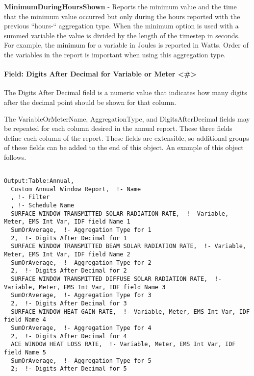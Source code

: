 \textbf{MinimumDuringHoursShown} - Reports the minimum value and the time that the minimum value occurred but only during the hours reported with the previous ``hours-`` aggregation type. When the minimum option is used with a summed variable the value is divided by the length of the timestep in seconds. For example, the minimum for a variable in Joules is reported in Watts. Order of the variables in the report is important when using this aggregation type.

\paragraph{Field: Digits After Decimal for Variable or Meter \textless{}\#\textgreater{}}\label{field-digits-after-decimal-for-variable-or-meter}

The Digits After Decimal field is a numeric value that indicates how many digits after the decimal point should be shown for that column.

The VariableOrMeterName, AggregationType, and DigitsAfterDecimal fields may be repeated for each column desired in the annual report. These three fields define each column of the report.  These fields are extensible, so additional groups of these fields can be added to the end of this object.  An example of this object follows.

\begin{lstlisting}

Output:Table:Annual,
  Custom Annual Window Report,  !- Name
  , !- Filter
  , !- Schedule Name
  SURFACE WINDOW TRANSMITTED SOLAR RADIATION RATE,  !- Variable, Meter, EMS Int Var, IDF field Name 1
  SumOrAverage,  !- Aggregation Type for 1
  2,  !- Digits After Decimal for 1
  SURFACE WINDOW TRANSMITTED BEAM SOLAR RADIATION RATE,  !- Variable, Meter, EMS Int Var, IDF field Name 2
  SumOrAverage,  !- Aggregation Type for 2
  2,  !- Digits After Decimal for 2
  SURFACE WINDOW TRANSMITTED DIFFUSE SOLAR RADIATION RATE,  !- Variable, Meter, EMS Int Var, IDF field Name 3
  SumOrAverage,  !- Aggregation Type for 3
  2,  !- Digits After Decimal for 3
  SURFACE WINDOW HEAT GAIN RATE,  !- Variable, Meter, EMS Int Var, IDF field Name 4
  SumOrAverage,  !- Aggregation Type for 4
  2,  !- Digits After Decimal for 4
  ACE WINDOW HEAT LOSS RATE,  !- Variable, Meter, EMS Int Var, IDF field Name 5
  SumOrAverage,  !- Aggregation Type for 5
  2;  !- Digits After Decimal for 5
\end{lstlisting}
